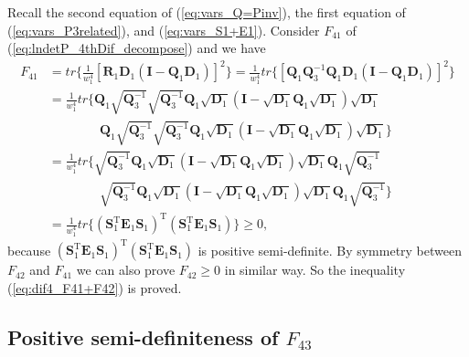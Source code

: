 \documentclass[12pt]{article}
\begin{document}
Recall the second equation of (\ref{eq:vars_Q=Pinv}), the first equation of (\ref{eq:vars_P3related}), and (\ref{eq:vars_S1+E1}). Consider $F_{41}$ of (\ref{eq:lndetP_4thDif_decompose}) and we have
\begin{align*}
F_{41} &= tr\{ \frac{1}{w_1^4} [ \mathbf{R}_1 \mathbf{D}_1 (\mathbf{I} - \mathbf{Q}_1 \mathbf{D}_1) ]^2 \} = \frac{1}{w_1^4} tr\{ [ \mathbf{Q}_1 \mathbf{Q}_3^{-1} \mathbf{Q}_1 \mathbf{D}_1 (\mathbf{I} - \mathbf{Q}_1 \mathbf{D}_1) ]^2 \}  \\
  &= \frac{1}{w_1^4} tr\{ \mathbf{Q}_1 \sqrt{\mathbf{Q}_3^{-1}} \sqrt{\mathbf{Q}_3^{-1}} \mathbf{Q}_1 \sqrt{\mathbf{D}_1} (\mathbf{I} - \sqrt{\mathbf{D}_1} \mathbf{Q}_1 \sqrt{\mathbf{D}_1}) \sqrt{\mathbf{D}_1}  \\ 
  & \qquad \qquad \mathbf{Q}_1 \sqrt{\mathbf{Q}_3^{-1}} \sqrt{\mathbf{Q}_3^{-1}} \mathbf{Q}_1 \sqrt{\mathbf{D}_1} (\mathbf{I} - \sqrt{\mathbf{D}_1} \mathbf{Q}_1 \sqrt{\mathbf{D}_1}) \sqrt{\mathbf{D}_1} \}  \\
  &= \frac{1}{w_1^4} tr\{ \sqrt{\mathbf{Q}_3^{-1}} \mathbf{Q}_1 \sqrt{\mathbf{D}_1} (\mathbf{I} - \sqrt{\mathbf{D}_1} \mathbf{Q}_1 \sqrt{\mathbf{D}_1}) \sqrt{\mathbf{D}_1} \mathbf{Q}_1 \sqrt{\mathbf{Q}_3^{-1}}  \\ 
  & \qquad \qquad \sqrt{\mathbf{Q}_3^{-1}} \mathbf{Q}_1 \sqrt{\mathbf{D}_1} (\mathbf{I} - \sqrt{\mathbf{D}_1} \mathbf{Q}_1 \sqrt{\mathbf{D}_1}) \sqrt{\mathbf{D}_1} \mathbf{Q}_1 \sqrt{\mathbf{Q}_3^{-1}} \}  \\
  &= \frac{1}{w_1^4} tr\{ (\mathbf{S}_1^{\mathrm{T}} \mathbf{E}_1 \mathbf{S}_1)^{\mathrm{T}} (\mathbf{S}_1^{\mathrm{T}} \mathbf{E}_1 \mathbf{S}_1) \} \geq 0,
\end{align*}
because $(\mathbf{S}_1^{\mathrm{T}} \mathbf{E}_1 \mathbf{S}_1)^{\mathrm{T}} (\mathbf{S}_1^{\mathrm{T}} \mathbf{E}_1 \mathbf{S}_1)$ is positive semi-definite. By symmetry between $F_{42}$ and $F_{41}$ we can also prove $F_{42} \geq 0$ in similar way. So the inequality (\ref{eq:dif4_F41+F42}) is proved.

\subsection{Positive semi-definiteness of $F_{43}$}  \label{app:dif4_F43}
\end{document}
